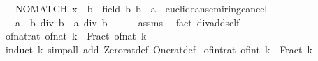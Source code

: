 \begin{isabellebody}
\ \ \ {\isachardoublequoteopen}NO{\isacharunderscore}{\kern0pt}MATCH\ {\isacharparenleft}{\kern0pt}x\ {\isacharcolon}{\kern0pt}{\isacharcolon}{\kern0pt}\ {\isacharprime}{\kern0pt}b\ {\isacharcolon}{\kern0pt}{\isacharcolon}{\kern0pt}\ field{\isacharparenright}{\kern0pt}\ b{\isachardoublequoteclose}\ {\isachardoublequoteopen}{\isacharparenleft}{\kern0pt}b\ {\isacharcolon}{\kern0pt}{\isacharcolon}{\kern0pt}\ {\isacharprime}{\kern0pt}a\ {\isacharcolon}{\kern0pt}{\isacharcolon}{\kern0pt}\ euclidean{\isacharunderscore}{\kern0pt}semiring{\isacharunderscore}{\kern0pt}cancel{\isacharparenright}{\kern0pt}\ {\isasymnoteq}\ {}{\isachardoublequoteclose}\isanewline
\ \ \ {\isachardoublequoteopen}{\isacharparenleft}{\kern0pt}a\ {\isacharplus}{\kern0pt}\ b{\isacharparenright}{\kern0pt}\ div\ b\ {\isacharequal}{\kern0pt}\ a\ div\ b\ {\isacharplus}{\kern0pt}\ {}{\isachardoublequoteclose}\isanewline
%
\isadelimproof
\ \ %
\endisadelimproof
%
\isatagproof
{}\isamarkupfalse%
\ assms{\isacharparenleft}{\kern0pt}{}{\isacharparenright}{\kern0pt}\ \isamarkupfalse%
\ {\isacharparenleft}{\kern0pt}fact\ div{\isacharunderscore}{\kern0pt}add{\isacharunderscore}{\kern0pt}self{}{\isacharparenright}{\kern0pt}%
\endisatagproof
{\isafoldproof}%
%
\isadelimproof
\isanewline
%
\endisadelimproof
\isanewline
{}\isamarkupfalse%
\ of{\isacharunderscore}{\kern0pt}nat{\isacharunderscore}{\kern0pt}rat{\isacharcolon}{\kern0pt}\ {\isachardoublequoteopen}of{\isacharunderscore}{\kern0pt}nat\ k\ {\isacharequal}{\kern0pt}\ Fract\ {\isacharparenleft}{\kern0pt}of{\isacharunderscore}{\kern0pt}nat\ k{\isacharparenright}{\kern0pt}\ {}{\isachardoublequoteclose}\isanewline
%
\isadelimproof
\ \ %
\endisadelimproof
%
\isatagproof
{}\isamarkupfalse%
\ {\isacharparenleft}{\kern0pt}induct\ k{\isacharparenright}{\kern0pt}\ {\isacharparenleft}{\kern0pt}simp{\isacharunderscore}{\kern0pt}all\ add{\isacharcolon}{\kern0pt}\ Zero{\isacharunderscore}{\kern0pt}rat{\isacharunderscore}{\kern0pt}def\ One{\isacharunderscore}{\kern0pt}rat{\isacharunderscore}{\kern0pt}def{\isacharparenright}{\kern0pt}%
\endisatagproof
{\isafoldproof}%
%
\isadelimproof
\isanewline
%
\endisadelimproof
\isanewline
{}\isamarkupfalse%
\ of{\isacharunderscore}{\kern0pt}int{\isacharunderscore}{\kern0pt}rat{\isacharcolon}{\kern0pt}\ {\isachardoublequoteopen}of{\isacharunderscore}{\kern0pt}int\ k\ {\isacharequal}{\kern0pt}\ Fract\ k\ {}{\isachardoublequoteclose}\isanewline

\end{isabellebody}
